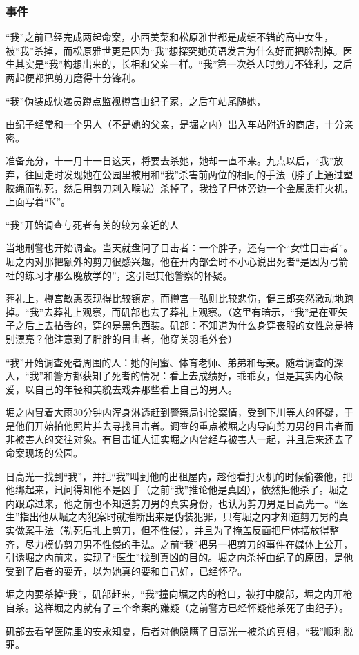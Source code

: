 \subsubsection{事件}
\begin{itemize*}
    \item “我”之前已经完成两起命案，小西美菜和松原雅世都是成绩不错的高中女生，被“我”杀掉，而松原雅世更是因为“我”想探究她英语发言为什么好而把脸割掉。医生其实是“我”构想出来的，长相和父亲一样。“我”第一次杀人时剪刀不锋利，之后两起便都把剪刀磨得十分锋利。
    \item “我”伪装成快递员蹲点监视樽宫由纪子家，之后车站尾随她，
    \item 由纪子经常和一个男人（不是她的父亲，是堀之内）出入车站附近的商店，十分亲密。
    \item 准备充分，十一月十一日这天，将要去杀她，她却一直不来。九点以后，“我”放弃，往回走时发现她在公园里被用和“我”杀害前两位的相同的手法（脖子上通过塑胶绳而勒死，然后用剪刀刺入喉咙）杀掉了，我捡了尸体旁边一个金属质打火机，上面写着“K”。
    \item “我”开始调查与死者有关的较为亲近的人
    \item 当地刑警也开始调查。当天就盘问了目击者：一个胖子，还有一个“女性目击者”。堀之内对那把额外的剪刀很感兴趣，他在开内部会时不小心说出死者“是因为弓箭社的练习才那么晚放学的”，这引起其他警察的怀疑。
    \item 葬礼上，樽宫敏惠表现得比较镇定，而樽宫一弘则比较悲伤，健三郎突然激动地跑掉。“我”去葬礼上观察，而矶部也去了葬礼上观察。（这里有暗示，“我”是在亚矢子之后上去拈香的，穿的是黑色西装。矶部：不知道为什么身穿丧服的女性总是特别漂亮？他注意到了胖胖的目击者，他穿关羽毛外套）
    \item “我”开始调查死者周围的人：她的闺蜜、体育老师、弟弟和母亲。随着调查的深入，“我”和警方都获知了死者的情况：看上去成绩好，乖乖女，但是其实内心缺爱，以自己的年轻和美貌去戏弄那些看上自己的男人。
    \item 堀之内冒着大雨30分钟内浑身淋透赶到警察局讨论案情，受到下川等人的怀疑，于是他们开始拍他照片并去寻找目击者。调查的重点被堀之内导向剪刀男的目击者而非被害人的交往对象。有目击证人证实堀之内曾经与被害人一起，并且后来还去了命案现场的公园。
    \item 日高光一找到“我”，并把“我”叫到他的出租屋内，趁他看打火机的时候偷袭他，把他绑起来，讯问得知他不是凶手（之前“我”推论他是真凶），依然把他杀了。堀之内跟踪过来，他之前也不知道剪刀男的真实身份，也认为剪刀男是日高光一。“医生”指出他从堀之内犯案时就推断出来是伪装犯罪，只有堀之内才知道剪刀男的真实做案手法（勒死后扎上剪刀，但不性侵），并且为了掩盖反面把尸体摆放得整齐，尽力模仿剪刀男不性侵的手法。之前“我”把另一把剪刀的事件在媒体上公开，引诱堀之内前来，实现了“医生”找到真凶的目的。堀之内杀掉由纪子的原因，是他受到了后者的耍弄，以为她真的要和自己好，已经怀孕。
    \item 堀之内要杀掉“我”，矶部赶来，“我”撞向堀之内的枪口，被打中腹部，堀之内开枪自杀。这样堀之内就有了三个命案的嫌疑（之前警方已经怀疑他杀死了由纪子）。
    \item 矶部去看望医院里的安永知夏，后者对他隐瞒了日高光一被杀的真相，“我”顺利脱罪。
\end{itemize*}

